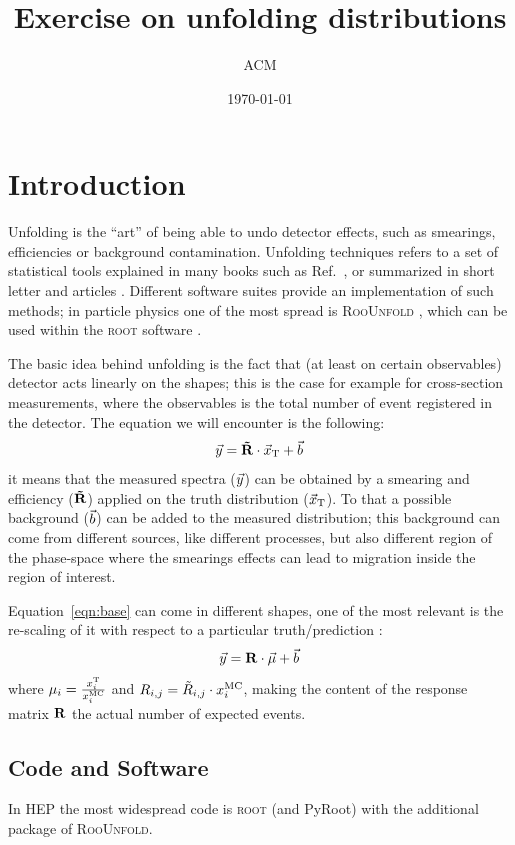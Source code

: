\documentclass[a4paper,11pt]{article}
\title{Exercise on unfolding distributions}
\author{ACM}
\date{\today}
\begin{document}
\maketitle

\section{Introduction}
Unfolding is the ``art'' of being able to undo detector effects, such as smearings, efficiencies or background contamination.
Unfolding techniques refers to a set of statistical tools explained in many books such as Ref.~\cite{Cowan}, 
or summarized in short letter and articles \cite{Cowan:unfolding}. 
Different software suites provide an implementation of such methods; 
in particle physics one of the most spread is {\scshape RooUnfold} \cite{RooUnfold}, 
which can be used within the {\scshape root} software \cite{ROOT}. 

The basic idea behind unfolding is the fact that (at least on certain observables) detector acts linearly on the shapes; this is the case for example for cross-section measurements, where the observables is the total number of event registered in the detector.
The equation we will encounter is the following:
\begin{equation}
	\vec{y}= \mathbf{\tilde{R}} \cdot \vec{x}_\textup{T} + \vec{b}
	\label{eqn:base}
\end{equation}
it means that the measured spectra ($\vec{y}$) can be obtained by a smearing and efficiency ($\mathbf{\tilde{R}}$) applied on the truth distribution ($\vec{x}_\textup{T}$). To that a possible background ($\vec{b}$) can be added to the measured distribution; this background can come from different sources, like different processes, but also different region of the phase-space where the smearings effects can lead to migration inside the region of interest.

Equation~\ref{eqn:base} can come in different shapes, one of the most relevant is the re-scaling of it with respect to a particular truth/prediction \cite{SVD}:
\begin{equation}
	\vec{y} = \mathbf{R} \cdot \vec{\mu} + \vec{b}
\end{equation}
where $\mu_{i} = \frac{x^\textup{T}_{i}}{x^\textup{MC}_{i}} $ and  $R_{i,j} = \tilde{R}_{i,j} \cdot x^\textup{MC}_{i} $, making the content of the response matrix $\mathbf{R}$ the actual number of expected events.

\subsection{Code and Software}
In HEP the most widespread code is {\scshape root} (and {PyRoot}) with the additional package of {\scshape RooUnfold}.
\end{document}
